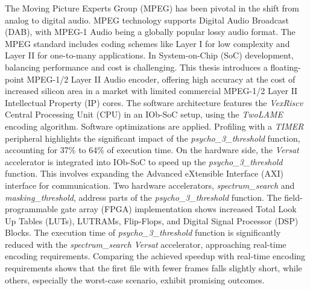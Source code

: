 The Moving Picture Experts Group (MPEG) has been pivotal in the shift from analog to digital audio. MPEG technology supports Digital Audio Broadcast (DAB), with MPEG-1 Audio being a globally popular lossy audio format. The MPEG standard includes coding schemes like Layer I for low complexity and Layer II for one-to-many applications.
In System-on-Chip (SoC) development, balancing performance and cost is challenging. This thesis introduces a floating-point MPEG-1/2 Layer II Audio encoder, offering high accuracy at the cost of increased silicon area in a market with limited commercial MPEG-1/2 Layer II Intellectual Property (IP) cores.
The software architecture features the \textit{VexRiscv} Central Processing Unit (CPU) in an IOb-SoC setup, using the \textit{TwoLAME} encoding algorithm. Software optimizations are applied. Profiling with a \textit{TIMER} peripheral highlights the significant impact of the \textit{psycho\_3\_threshold} function, accounting for 37\% to 64\% of execution time.
On the hardware side, the \textit{Versat} accelerator is integrated into IOb-SoC to speed up the \textit{psycho\_3\_threshold} function. This involves expanding the Advanced eXtensible Interface (AXI) interface for communication. Two hardware accelerators, \textit{spectrum\_search} and \textit{masking\_threshold}, address parts of the \textit{psycho\_3\_threshold} function. The field-programmable gate array (FPGA) implementation shows increased Total Look Up Tables (LUTs), LUTRAMs, Flip-Flops, and Digital Signal Processor (DSP) Blocks.
The execution time of \textit{psycho\_3\_threshold} function is significantly reduced with the \textit{spectrum\_search} \textit{Versat} accelerator, approaching real-time encoding requirements.
Comparing the achieved speedup with real-time encoding requirements shows that the first file with fewer frames falls slightly short, while others, especially the worst-case scenario, exhibit promising outcomes.